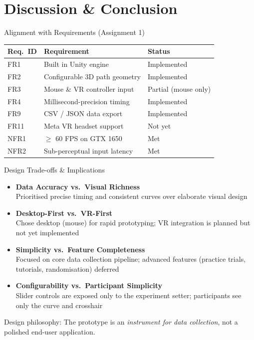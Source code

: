 \documentclass[aspectratio=169, 10pt]{beamer}
\begin{document}
\section{Discussion \& Conclusion}

\begin{frame}{Alignment with Requirements (Assignment 1)}
  \small
  \begin{tabular}{@{}l p{5.8cm} l@{}}
    \toprule
    \textbf{Req.\ ID} & \textbf{Requirement} & \textbf{Status} \\
    \midrule
    FR1  & Built in Unity engine                      & \alert{Implemented} \\
    FR2  & Configurable 3D path geometry              & \alert{Implemented} \\
    FR3  & Mouse \& VR controller input               & Partial (mouse only) \\
    FR4  & Millisecond-precision timing               & \alert{Implemented} \\
    FR9  & CSV / JSON data export                     & \alert{Implemented} \\
    FR11 & Meta VR headset support                    & Not yet \\
    NFR1 & $\geq$ 60 FPS on GTX 1650                 & \alert{Met} \\
    NFR2 & Sub-perceptual input latency               & \alert{Met} \\
    \bottomrule
  \end{tabular}
\end{frame}

\begin{frame}{Design Trade-offs \& Implications}
  \begin{itemize}
    \item \textbf{Data Accuracy vs.\ Visual Richness}\\
          Prioritised precise timing and consistent curves over elaborate visual design
    \item \textbf{Desktop-First vs.\ VR-First}\\
          Chose desktop (mouse) for rapid prototyping; VR integration is planned but not yet implemented
    \item \textbf{Simplicity vs.\ Feature Completeness}\\
          Focused on core data collection pipeline; advanced features (practice trials, tutorials, randomisation) deferred
    \item \textbf{Configurability vs.\ Participant Simplicity}\\
          Slider controls are exposed only to the experiment setter; participants see only the curve and crosshair
  \end{itemize}

  \vspace{0.5em}
  \alert{Design philosophy:} The prototype is an \emph{instrument for data collection}, not a polished end-user application.
\end{frame}
\end{document}
